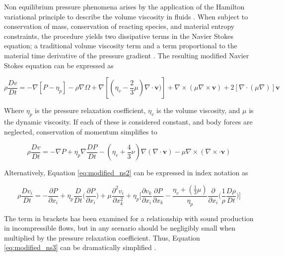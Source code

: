 Non equilibrium pressure phenomena arises by the application of the 
Hamilton variational principle to describe the volume viscosity in fluids 
\cite{zuckerwar2006}. When subject to conservation of mass, conservation of 
reacting species, and material entropy constraints, the procedure yields two 
dissipative terms in the Navier Stokes equation; a traditional volume viscosity 
term and a term proportional to the material time derivative of the pressure 
gradient \cite{zuckerwar2009}. The resulting modified Navier Stokes equation 
can be expressed as

\begin{equation}
\rho \frac{Dv}{Dt} = - \nabla[P - \eta_p] -
\rho \nabla \Omega + 
\nabla[(\eta_v - \frac{2}{3} \mu)\nabla \cdot \pmb{\text{v}})] + 
\nabla \times (\mu \nabla \times \pmb{\text{v}}) + 
2[\nabla \cdot (\mu \nabla)] \pmb{\text{v}}
\label{eq:modified_ns1}
\end{equation}

\noindent
Where $\eta_p$ is the pressure relaxation coefficient, $\eta_v$ is the volume 
viscosity, and $\mu$ is the dynamic viscosity. If each of these is considered 
constant, and body forces are neglected, conservation of momentum simplifies to 

\begin{equation}
\rho \frac{Dv}{Dt} = - \nabla P + \eta_p \nabla \frac{DP}{Dt} - 
(\eta_v + \frac{4}{3}\nu) \nabla (\nabla \cdot\pmb{\text{v}})
- \mu \nabla \times (\nabla \times \cdot\pmb{\text{v}})
\label{eq:modified_ns2}
\end{equation}

\noindent
Alternatively, Equation \ref{eq:modified_ns2} can be expressed in index 
notation as 

\begin{equation}
\rho \frac{Dv_i}{Dt} = -\frac{\partial P}{\partial x_i} +
\eta_p \frac{D}{Dt} \Bigg( \frac{\partial P}{\partial x_i} \Bigg) + 
\mu \frac{\partial^2 v_i}{\partial x_{k}^2} + 
\eta_p \Bigg[\frac{\partial v_k}{\partial x_i} \frac{\partial P}{\partial x_k} -
\frac{\eta_v + (\frac{1}{3}\mu)}{\eta_p} \frac{\partial}{\partial 
x_i} \Bigg( \frac{1}{\rho} \frac{D\rho}{Dt} \Bigg) \Bigg]
\label{eq:modified_ns3}
\end{equation}

The term in brackets has been examined for a relationship with sound production 
in incompressible flows, but in any scenario should be negligibly small when 
multiplied by the pressure relaxation coefficient. Thus, Equation 
\ref{eq:modified_ns3} can be dramatically simplified \cite{ash2011}.

